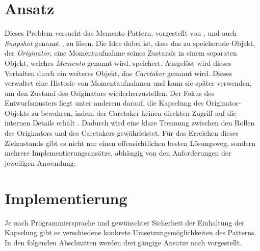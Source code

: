 \documentclass[9pt,conference]{IEEEtran}
\begin{document}
\section{Ansatz}
Dieses Problem versucht das Memento Pattern, vorgestellt von , und auch \emph{Snapshot} genannt \cite{refactoring-guru}, zu lösen.
Die Idee dabei ist, dass das zu speichernde Objekt, der \emph{Originator}, eine Momentaufnahme seines Zustands in einem separaten Objekt, welches \emph{Memento} genannt wird, speichert.
Ausgelöst wird dieses Verhalten durch ein weiteres Objekt, das \emph{Caretaker} genannt wird.
Dieses verwaltet eine Historie von Momentaufnahmen und kann sie später verwenden, um den Zustand des Originators wiederherzustellen.
Der Fokus des Entwurfsmusters liegt unter anderem darauf, die Kapselung des Originator-Objekts zu bewahren, indem der Caretaker keinen direkten Zugriff auf die internen Details erhält \cite{geeksforgeeks}.
Dadurch wird eine klare Trennung zwischen den Rollen des Originators und des Caretakers gewährleistet.
Für das Erreichen dieses Zielzustands gibt es nicht nur einen offensichtlichen besten Lösungsweg, sondern mehrere Implementierungsansätze, abhängig von den Anforderungen der jeweiligen Anwendung.

\section{Implementierung}
Je nach Programmiersprache und gewünschter Sicherheit der Einhaltung der Kapselung gibt es verschiedene konkrete Umsetzungsmöglichkeiten des Patterns.
In den folgenden Abschnitten werden drei gängige Ansätze nach \cite{refactoring-guru} vorgestellt.
\end{document}
